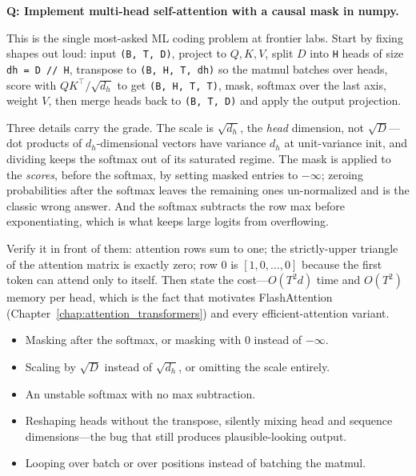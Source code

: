 \begin{interviewq}
\textbf{Q: Implement multi-head self-attention with a causal mask in numpy.}

 \quad {} \quad \badgefreq{\freqhigh}

\stronganswer

This is the single most-asked ML coding problem at frontier labs. Start by fixing shapes out loud: input \texttt{(B, T, D)}, project to $Q, K, V$, split $D$ into \texttt{H} heads of size \texttt{dh = D // H}, transpose to \texttt{(B, H, T, dh)} so the matmul batches over heads, score with $QK^\top/\sqrt{d_h}$ to get \texttt{(B, H, T, T)}, mask, softmax over the last axis, weight $V$, then merge heads back to \texttt{(B, T, D)} and apply the output projection.

Three details carry the grade. The scale is $\sqrt{d_h}$, the \emph{head} dimension, not $\sqrt{D}$---dot products of $d_h$-dimensional vectors have variance $d_h$ at unit-variance init, and dividing keeps the softmax out of its saturated regime. The mask is applied to the \emph{scores}, before the softmax, by setting masked entries to $-\infty$; zeroing probabilities after the softmax leaves the remaining ones un-normalized and is the classic wrong answer. And the softmax subtracts the row max before exponentiating, which is what keeps large logits from overflowing.

Verify it in front of them: attention rows sum to one; the strictly-upper triangle of the attention matrix is exactly zero; row 0 is $[1, 0, \ldots, 0]$ because the first token can attend only to itself. Then state the cost---$O(T^2 d)$ time and $O(T^2)$ memory per head, which is the fact that motivates FlashAttention (Chapter~\ref{chap:attention_transformers}) and every efficient-attention variant.

\redflags
\begin{itemize}
    \item Masking after the softmax, or masking with 0 instead of $-\infty$.
    \item Scaling by $\sqrt{D}$ instead of $\sqrt{d_h}$, or omitting the scale entirely.
    \item An unstable softmax with no max subtraction.
    \item Reshaping heads without the transpose, silently mixing head and sequence dimensions---the bug that still produces plausible-looking output.
    \item Looping over batch or over positions instead of batching the matmul.
\end{itemize}


\end{interviewq}
